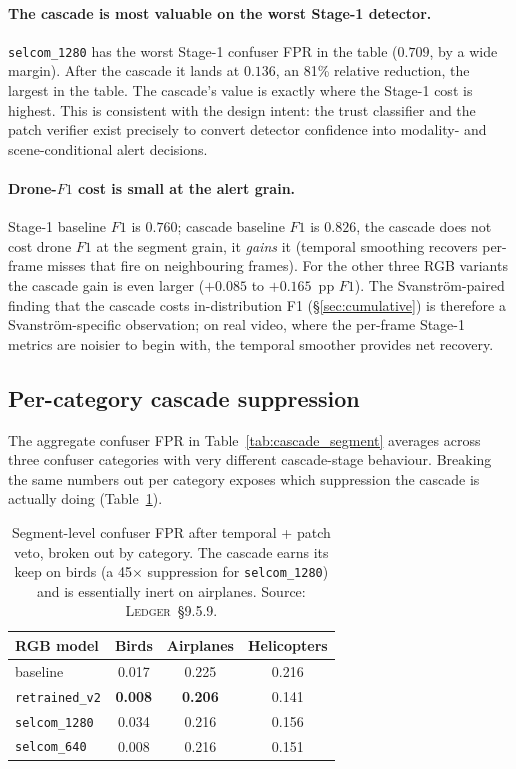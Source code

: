 \documentclass[12pt,a4paper,oneside,openright]{book}
\begin{document}
\paragraph{The cascade is most valuable on the worst Stage-1 detector.}
\texttt{selcom\_1280} has the worst Stage-1 confuser FPR in the table ($0.709$, by a wide margin). After the cascade it lands at $0.136$, an 81\% relative reduction, the largest in the table. The cascade's value is exactly where the Stage-1 cost is highest. This is consistent with the design intent: the trust classifier and the patch verifier exist precisely to convert detector confidence into modality- and scene-conditional alert decisions.

\paragraph{Drone-$F1$ cost is small at the alert grain.}
Stage-1 baseline $F1$ is $0.760$; cascade baseline $F1$ is $0.826$, the cascade does not cost drone $F1$ at the segment grain, it \emph{gains} it (temporal smoothing recovers per-frame misses that fire on neighbouring frames). For the other three RGB variants the cascade gain is even larger ($+0.085$ to $+0.165$~pp $F1$). The Svanstr\"om-paired finding that the cascade costs in-distribution F1 (\S\ref{sec:cumulative}) is therefore a Svanstr\"om-specific observation; on real video, where the per-frame Stage-1 metrics are noisier to begin with, the temporal smoother provides net recovery.

\subsection{Per-category cascade suppression}
\label{sec:realvideo_percategory}

The aggregate confuser FPR in Table~\ref{tab:cascade_segment} averages across three confuser categories with very different cascade-stage behaviour. Breaking the same numbers out per category exposes which suppression the cascade is actually doing (Table~\ref{tab:cascade_percategory}).

\begin{table}[htbp]
    \centering
    \caption{Segment-level confuser FPR after temporal + patch veto, broken out by category. The cascade earns its keep on birds (a 45$\times$ suppression for \texttt{selcom\_1280}) and is essentially inert on airplanes. Source: \textsc{Ledger}~\S9.5.9.}
    \label{tab:cascade_percategory}
    \begin{tabular}{lccc}
        \toprule
        RGB model & Birds & Airplanes & Helicopters \\
        \midrule
        baseline           & 0.017 & 0.225 & 0.216 \\
        \texttt{retrained\_v2} & \textbf{0.008} & \textbf{0.206} & 0.141 \\
        \texttt{selcom\_1280}  & 0.034 & 0.216 & 0.156 \\
        \texttt{selcom\_640}   & 0.008 & 0.216 & 0.151 \\
        \bottomrule
    \end{tabular}
\end{table}
\end{document}
